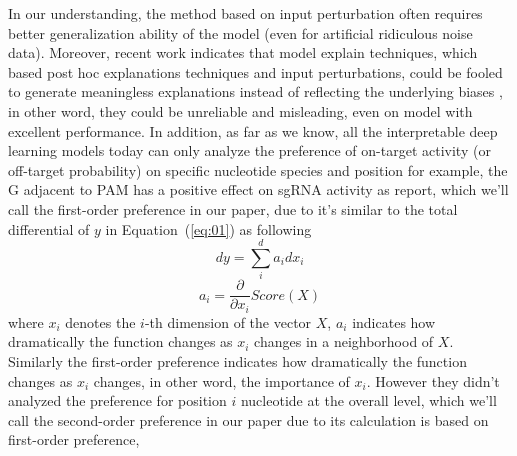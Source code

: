 \documentclass{bioinfo}
\begin{document}
 In our understanding, the method based on input perturbation often requires better generalization ability of the model (even for artificial ridiculous noise data). 
 Moreover, recent work indicates that model explain techniques, which based post hoc explanations techniques and input perturbations, could be fooled to generate meaningless explanations instead of reflecting the underlying biases \citep{slack2019fooling}, 
 in other word, they could be unreliable and misleading, even on model with excellent performance. 
 In addition, as far as we know, all the interpretable deep learning models today can only analyze the preference of on-target activity (or off-target probability) on specific nucleotide species and position 
 for example, the G adjacent to PAM has a positive effect on sgRNA activity as \citeauthor{wang2019optimized} report, 
 which we'll call the first-order preference in our paper, due to it's similar to the total differential of $y$ in Equation~(\ref{eq:01}) as following
\begin{equation}
dy = \sum^{d}_ia_idx_i\label{eq:02}
\end{equation}
\begin{equation}
a_i=\frac{\partial}{\partial x_i} Score(X)\label{eq:03}
\end{equation}
 where $x_i$ denotes the $i$-th dimension of the vector $X$, 
 $a_i$ indicates how dramatically the function changes as $x_i$ changes in a neighborhood of $X$. 
 Similarly the first-order preference indicates how dramatically the function changes as $x_i$ changes, in other word, the importance of $x_i$.
 However they didn't analyzed the preference for position $i$ nucleotide at the overall level, 
 which we'll call the second-order preference in our paper due to its calculation is based on first-order preference, 
\end{document}
